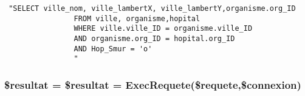\footnotesize\begin{verbatim} "SELECT ville_nom, ville_lambertX, ville_lambertY,organisme.org_ID
                FROM ville, organisme,hopital
                WHERE ville.ville_ID = organisme.ville_ID
                AND organisme.org_ID = hopital.org_ID
                AND Hop_Smur = 'o'
                "
\end{verbatim}\normalsize 
\hypertarget{cherche__moyen_8php_a2}{
\subsubsection[\$resultat]{\setlength{\rightskip}{0pt plus 5cm}\$resultat = \$resultat = Exec\-Requete(\$requete,\$connexion)}}
\label{cherche__moyen_8php_a2}


